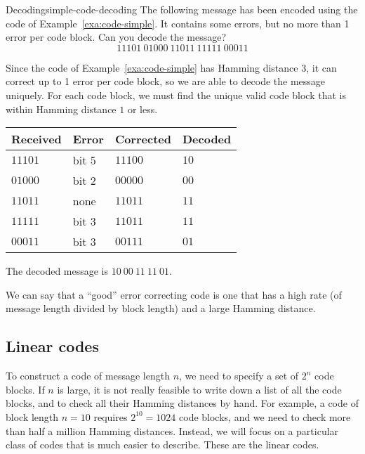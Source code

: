 \begin{example}{Decoding}{simple-code-decoding}
  The following message has been encoded using the code of
  Example~\ref{exa:code-simple}. It contains some errors, but no more
  than 1 error per code block. Can you decode the message?
  \begin{equation*}
    11101~01000~11011~11111~00011
  \end{equation*}
\end{example}

\begin{solution}
  Since the code of Example~\ref{exa:code-simple} has Hamming distance
  $3$, it can correct up to 1 error per code block, so we are able to
  decode the message uniquely. For each code block, we must find the
  unique valid code block that is within Hamming distance $1$ or less.
  \begin{center}
    \begin{tabular}{|l|l|l|l|}
      \hline
      Received & Error & Corrected & Decoded \\\hline
      $11101$  & bit 5 & $11100$   & $10$    \\
      $01000$  & bit 2 & $00000$   & $00$    \\
      $11011$  & none  & $11011$   & $11$    \\
      $11111$  & bit 3 & $11011$   & $11$    \\
      $00011$  & bit 3 & $00111$   & $01$    \\
      \hline
    \end{tabular}
  \end{center}
  The decoded message is $10~00~11~11~01$.
\end{solution}

We can say that a ``good'' error correcting code is one that has a
high rate (of message length divided by block length) and a large
Hamming distance.

\subsection*{Linear codes}

To construct a code of message length $n$, we need to specify a set of
$2^n$ code blocks. If $n$ is large, it is not really feasible to write
down a list of all the code blocks, and to check all their Hamming
distances by hand. For example, a code of block length $n=10$ requires
$2^{10}=1024$ code blocks, and we need to check more than half a
million Hamming distances. Instead, we will focus on a particular
class of codes that is much easier to describe. These are the linear
codes.

